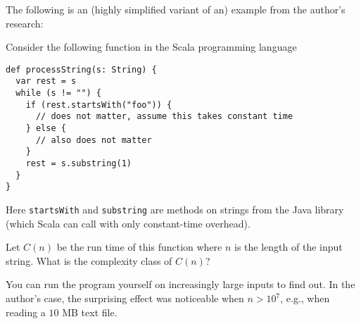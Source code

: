 \documentclass[a4paper]{article}
\begin{document}
\header

The following is an (highly simplified variant of an) example from the author's research:

\begin{example}\label{ex:ad:quadraticstringprocessor}
Consider the following function in the Scala programming language
\begin{lstlisting}
def processString(s: String) {
  var rest = s
  while (s != "") {
    if (rest.startsWith("foo")) {
      // does not matter, assume this takes constant time
    } else {
      // also does not matter
    }
    rest = s.substring(1)
  }
}
\end{lstlisting}
Here \lstinline|startsWith| and \lstinline|substring| are methods on strings from the Java library (which Scala can call with only constant-time overhead).

Let $C(n)$ be the run time of this function where $n$ is the length of the input string.
What is the complexity class of $C(n)$?

You can run the program yourself on increasingly large inputs to find out.
In the author's case, the surprising effect was noticeable when $n>10^7$, e.g., when reading a $10$ MB text file.
\end{example}
\end{document}
